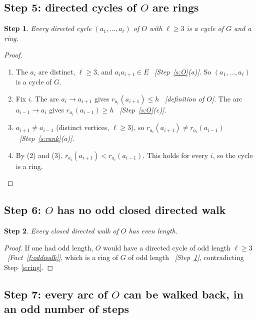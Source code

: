 \documentclass[11pt]{article}
\theoremstyle{plain}
\newtheorem{claim}{Step}
\theoremstyle{definition}
\newcommand{\half}{h}
\newcommand{\why}[1]{\unskip\ \textit{[#1]}}
\newenvironment{steps}{\begin{enumerate}[label=(\arabic*),leftmargin=2.2em,itemsep=0.35em]}{\end{enumerate}}
\begin{document}
\subsection*{Step 5: directed cycles of $O$ are rings}

\begin{claim}\label{s:dicycle}
Every directed cycle $(a_1,\dots,a_\ell)$ of $O$ with $\ell\ge 3$ is a cycle of $G$ and a ring.
\end{claim}

\begin{proof}
\begin{steps}
  \item The $a_i$ are distinct, $\ell\ge 3$, and $a_ia_{i+1}\in E$ \why{Step~\ref{s:O}(a)}. So
    $(a_1,\dots,a_\ell)$ is a cycle of $G$.
  \item Fix $i$. The arc $a_i\to a_{i+1}$ gives $r_{a_i}(a_{i+1})\le\half$ \why{definition of
    $O$}. The arc $a_{i-1}\to a_i$ gives $r_{a_i}(a_{i-1})\ge\half$ \why{Step~\ref{s:O}(c)}.
  \item $a_{i+1}\ne a_{i-1}$ (distinct vertices, $\ell\ge 3$), so
    $r_{a_i}(a_{i+1})\ne r_{a_i}(a_{i-1})$ \why{Step~\ref{s:rank}(a)}.
  \item By (2) and (3), $r_{a_i}(a_{i+1})<r_{a_i}(a_{i-1})$. This holds for every $i$, so the
    cycle is a ring. \qedhere
\end{steps}
\end{proof}

\subsection*{Step 6: $O$ has no odd closed directed walk}

\begin{claim}\label{s:noodd}
Every closed directed walk of $O$ has even length.
\end{claim}

\begin{proof}
If one had odd length, $O$ would have a directed cycle of odd length $\ell\ge 3$
\why{Fact~\ref{f:oddwalk}}, which is a ring of $G$ of odd length \why{Step~\ref{s:dicycle}},
contradicting Step~\ref{s:ring}.
\end{proof}

\subsection*{Step 7: every arc of $O$ can be walked back, in an odd number of steps}
\end{document}
